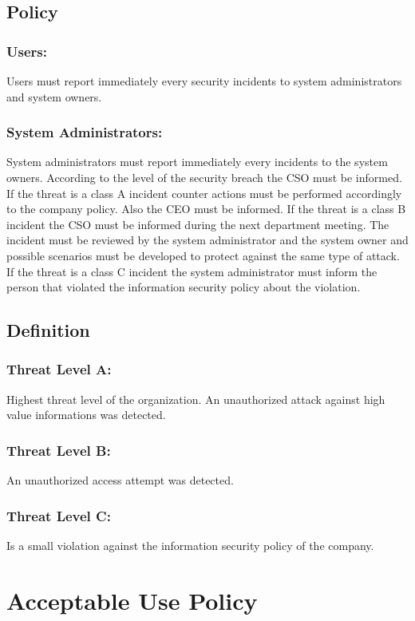 \section{Policy}
\subsection{Users:} 
Users must report immediately every security incidents to system administrators and system owners. 
\subsection{System Administrators:}
System administrators must report immediately every incidents to the system owners. According to the level of the security breach the CSO must be informed.
\newline  
If the threat is a class A incident counter actions must be performed accordingly to the company policy. Also the CEO must be informed.
\newline
If the threat is a class B incident the CSO must be informed during the next department meeting.  The incident must be reviewed by the system administrator and the system owner and possible scenarios must be developed to protect against the same type of attack. 
\newline
If the threat is a class C incident the system administrator must inform the person that violated the information security policy about the violation.   
\section{Definition}
\subsection{Threat Level A:}
Highest threat level of the organization. An unauthorized attack against high value informations was detected.  
\subsection{Threat Level B:} 
An unauthorized access attempt was detected. 
\subsection{Threat Level C:}
Is a small violation against the information security policy of the company.  
\chapter{Acceptable Use Policy}
